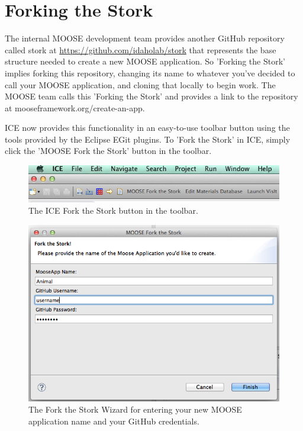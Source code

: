 \section{Forking the Stork}\label{forking-the-stork}

The internal MOOSE development team provides another GitHub repository
called stork at \url{https://github.com/idaholab/stork} that represents
the base structure needed to create a new MOOSE application. So 'Forking
the Stork' implies forking this repository, changing its name to
whatever you've decided to call your MOOSE application, and cloning that
locally to begin work. The MOOSE team calls this 'Forking the Stork' and
provides a link to the repository at mooseframework.org/create-an-app.

ICE now provides this functionality in an easy-to-use toolbar button
using the tools provided by the Eclipse EGit plugins. To 'Fork the
Stork' in ICE, simply click the 'MOOSE Fork the Stork' button in the
toolbar.

\begin{figure}[htbp]
\centering
\includegraphics[width=\textwidth]{figures/Fork_button.png}
\caption{The ICE Fork the Stork button in the toolbar. }
\end{figure}
\begin{figure}[htbp]
\centering
\includegraphics[width=\textwidth]{figures/Fork_dialog.png}
\caption{The Fork the Stork Wizard for entering your new MOOSE application name and your GitHub credentials.}
\end{figure}

